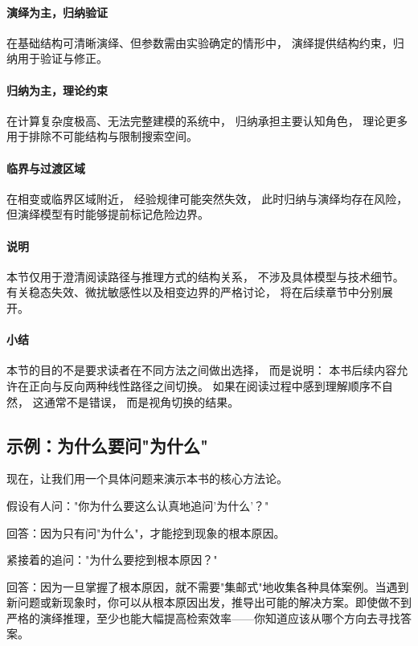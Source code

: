 \documentclass[openany, a4paper, 12pt]{book}
\begin{document}
\paragraph{演绎为主，归纳验证}
在基础结构可清晰演绎、但参数需由实验确定的情形中，
演绎提供结构约束，归纳用于验证与修正。

\paragraph{归纳为主，理论约束}
在计算复杂度极高、无法完整建模的系统中，
归纳承担主要认知角色，
理论更多用于排除不可能结构与限制搜索空间。

\paragraph{临界与过渡区域}
在相变或临界区域附近，
经验规律可能突然失效，
此时归纳与演绎均存在风险，
但演绎模型有时能够提前标记危险边界。

\paragraph{说明}
本节仅用于澄清阅读路径与推理方式的结构关系，
不涉及具体模型与技术细节。
有关稳态失效、微扰敏感性以及相变边界的严格讨论，
将在后续章节中分别展开。


\paragraph{小结}
本节的目的不是要求读者在不同方法之间做出选择，
而是说明：
本书后续内容允许在正向与反向两种线性路径之间切换。
如果在阅读过程中感到理解顺序不自然，
这通常不是错误，
而是视角切换的结果。


	\subsection{示例：为什么要问"为什么"}

现在，让我们用一个具体问题来演示本书的核心方法论。

假设有人问："你为什么要这么认真地追问'为什么'？"

回答：因为只有问"为什么"，才能挖到现象的根本原因。

紧接着的追问："为什么要挖到根本原因？"

回答：因为一旦掌握了根本原因，就不需要"集邮式"地收集各种具体案例。当遇到新问题或新现象时，你可以从根本原因出发，推导出可能的解决方案。即使做不到严格的演绎推理，至少也能大幅提高检索效率——你知道应该从哪个方向去寻找答案。
\end{document}
